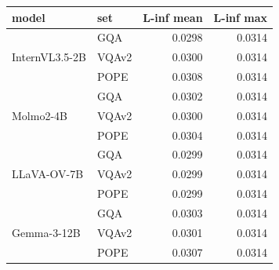 \small
\setlength{\tabcolsep}{7pt}
\begin{tabular}{@{}llrr@{}}
\toprule
model & set & L-inf mean & L-inf max \\
\midrule
\multirow{3}{*}{InternVL3.5-2B} & GQA & 0.0298 & 0.0314 \\
 & VQAv2 & 0.0300 & 0.0314 \\
 & POPE & 0.0308 & 0.0314 \\
\midrule
\multirow{3}{*}{Molmo2-4B} & GQA & 0.0302 & 0.0314 \\
 & VQAv2 & 0.0300 & 0.0314 \\
 & POPE & 0.0304 & 0.0314 \\
\midrule
\multirow{3}{*}{LLaVA-OV-7B} & GQA & 0.0299 & 0.0314 \\
 & VQAv2 & 0.0299 & 0.0314 \\
 & POPE & 0.0299 & 0.0314 \\
\midrule
\multirow{3}{*}{Gemma-3-12B} & GQA & 0.0303 & 0.0314 \\
 & VQAv2 & 0.0301 & 0.0314 \\
 & POPE & 0.0307 & 0.0314 \\
\bottomrule
\end{tabular}
